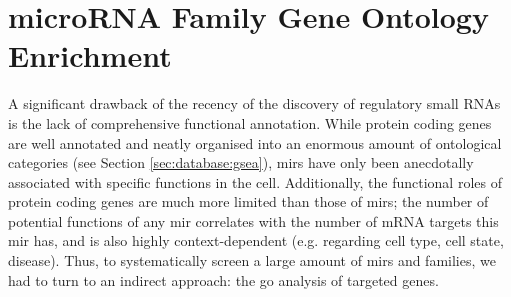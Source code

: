 \clearpage
\section{microRNA Family Gene Ontology Enrichment} \label{sec:cellculture:mir-go}
A significant drawback of the recency of the discovery of regulatory small RNAs is the lack of comprehensive functional annotation. While protein coding genes are well annotated and neatly organised into an enormous amount of ontological categories (see Section \ref{sec:database:gsea}), \acp{mir} have only been anecdotally associated with specific functions in the cell. Additionally, the functional roles of protein coding genes are much more limited than those of \acp{mir}; the number of potential functions of any \ac{mir} correlates with the number of mRNA targets this \ac{mir} has, and is also highly context-dependent (e.g. regarding cell type, cell state, disease). Thus, to systematically screen a large amount of \acp{mir} and families, we had to turn to an indirect approach: the \ac{go} analysis of targeted genes.

